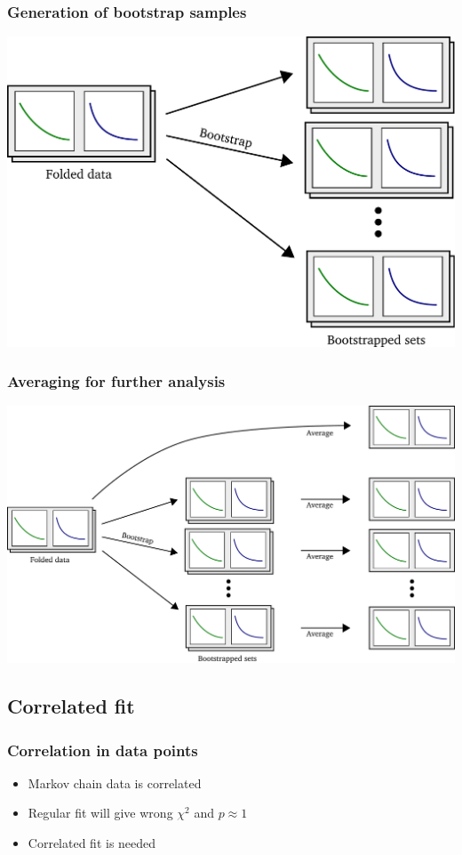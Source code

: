 \documentclass[english, fleqn]{beamer}
\begin{document}
\begin{frame}
    \frametitle{Generation of bootstrap samples}
    \begin{center}
        \includegraphics[scale=\scale]{sketches/03-bootstrap.pdf}
    \end{center}
\end{frame}

\begin{frame}
    \frametitle{Averaging for further analysis}
    \begin{center}
        \includegraphics[scale=\scale]{sketches/04-bootstrap.pdf}
    \end{center}
\end{frame}

\subsection{Correlated fit}

\begin{frame}
    \frametitle{Correlation in data points}
    \begin{itemize}
        \item
            Markov chain data is correlated
        \item
            Regular fit will give wrong $\chi^2$ and $p \approx 1$
        \item
            Correlated fit is needed
    \end{itemize}
\end{frame}
\end{document}
